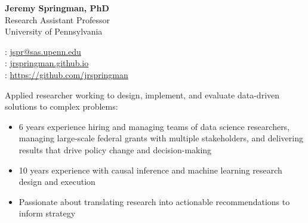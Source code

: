 \documentclass[11pt]{article}
\renewcommand{\today}{\monthname[\the\month] \the\year}
\begin{document}
\thispagestyle{empty}



\begin{multicols}{2}
{\Large {\bf Jeremy Springman, PhD}}\\
Research Assistant Professor\\
University of Pennsylvania\\

\columnbreak
\begin{flushright}

\faEnvelope: \href{mailto:jspr@sas.upenn.edu}{jspr@sas.upenn.edu}\\
\faLaptop: \url{jrspringman.github.io}\\
\faGithub: \url{https://github.com/jrspringman}\\
\end{flushright}
\end{multicols}
\vspace{-10pt}

Applied researcher working to design, implement, and evaluate data-driven solutions to complex problems:
\begin{itemize}[itemsep=0mm, parsep=0pt]
\item 6 years experience hiring and managing teams of data science researchers, managing large-scale federal grants with multiple stakeholders, and delivering results that drive policy change and decision-making
\item 10 years experience with causal inference and machine learning research design and execution
\item Passionate about translating research into actionable recommendations to inform strategy
\end{itemize}
\end{document}
